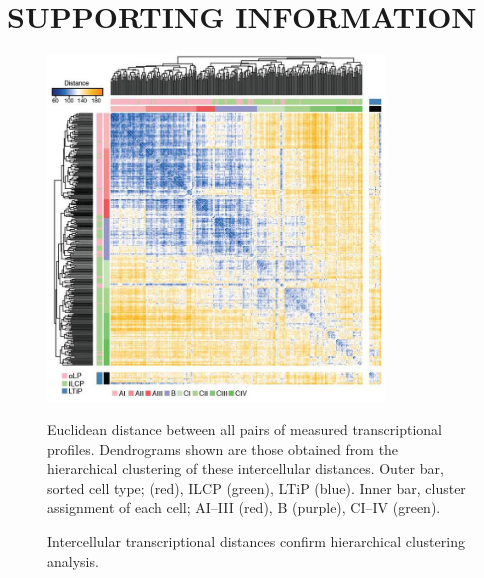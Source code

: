 \newpage
\section{SUPPORTING INFORMATION}
\setcounter{figure}{0}

\begin{figure}[h]
\begin{center}
	\includegraphics[width=0.8\textwidth]{figures/chapter3/S1}
\end{center}
	\caption{Intercellular transcriptional distances confirm hierarchical clustering analysis.} 
	Euclidean distance between all pairs of measured transcriptional profiles. Dendrograms shown are those obtained from the hierarchical clustering of these intercellular distances. Outer bar, sorted cell type; \aLP (red), ILCP (green), LTiP (blue). Inner bar, cluster assignment of each cell; AI--III (red), B (purple), CI--IV (green).
	\label{fig:chap3_S1}
\end{figure}

